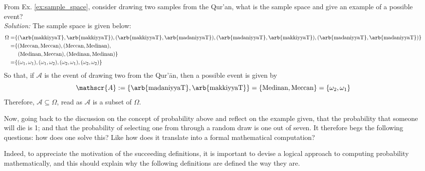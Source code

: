 \begin{exmp}
From Ex. \ref{ex:sample_space}, consider drawing two samples from the Qur'an, what is the sample space and give an example of a possible event?\\
\textit{Solution:} The sample space is given below:
\begin{align}
    \Omega=&\{(\text{\arb{makkiyyaT}},\text{\arb{makkiyyaT}}),(\text{\arb{makkiyyaT}},\text{\arb{madaniyyaT}}), (\text{\arb{madaniyyaT}}, \text{\arb{makkiyyaT}}), (\text{\arb{madaniyyaT}}, \text{\arb{madaniyyaT}})\}\nonumber\\
    =&\{(\text{Meccan},\text{Meccan}),(\text{Meccan},\text{Medinan}), \\
    &\;\;(\text{Medinan},\text{Meccan}), (\text{Medinan},\text{Medinan})\}\\
    =&\{(\omega_1,\omega_1),(\omega_1,\omega_2),(\omega_2,\omega_1),(\omega_2,\omega_2)\}
\end{align}
So that, if $\mathscr{A}$ is the event of drawing two   from the Qur'\=an, then a possible event is given by 
\begin{equation}
    \mathscr{A}:=\{\text{\arb{madaniyyaT}}, \text{\arb{makkiyyaT}}\}=\{\text{Medinan}, \text{Meccan}\}=\{\omega_2,\omega_1\}
\end{equation}
Therefore, $\mathscr{A}\subseteq\Omega$, read as $\mathscr{A}$ is a subset of $\Omega$.
\end{exmp}
Now, going back to the discussion on the concept of probability above and reflect on the example given, that the probability that someone will die is 1; and that the probability of selecting one   from   through a random draw is one out of seven. It therefore begs the following questions: how does one solve this? Like how does it translate into a formal mathematical computation?

Indeed, to appreciate the motivation of the succeeding definitions, it is important to devise a logical approach to computing probability mathematically, and this should explain why the following definitions are defined the way they are.

